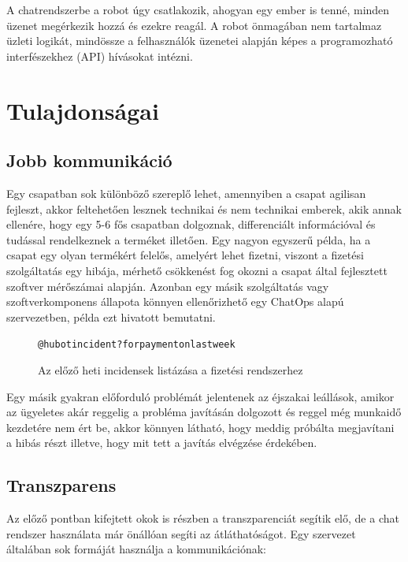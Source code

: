 A chatrendszerbe a robot úgy csatlakozik, ahogyan egy ember is tenné, minden üzenet megérkezik hozzá és ezekre reagál. A robot önmagában nem tartalmaz üzleti logikát, mindössze a felhasználók üzenetei alapján képes a programozható interfészekhez (API) hívásokat intézni.

\section{Tulajdonságai}

\subsection*{Jobb kommunikáció}
\label{subsection:better_communication}
Egy csapatban sok különböző szereplő lehet, amennyiben a csapat agilisan fejleszt, akkor feltehetően lesznek technikai és nem technikai emberek, akik annak ellenére, hogy egy 5-6 fős csapatban dolgoznak, differenciált információval és tudással rendelkeznek a terméket illetően. Egy nagyon egyszerű példa, ha a csapat egy olyan termékért felelős, amelyért lehet fizetni, viszont a fizetési szolgáltatás egy hibája, mérhető csökkenést fog okozni a csapat által fejlesztett szoftver mérőszámai alapján. Azonban egy másik szolgáltatás vagy szoftverkomponens állapota könnyen ellenőrizhető egy ChatOps alapú szervezetben,  példa ezt hivatott bemutatni.\\

\begin{figure}[H]
    \begin{alltt}
    @hubot incident? for payment on last week
    \end{alltt}
    \caption[DUMMY]%
    {Az előző heti incidensek listázása a fizetési rendszerhez}%
    \label{fig:get_outage_for_payment}
\end{figure}

Egy másik gyakran előforduló problémát jelentenek az éjszakai leállások, amikor az ügyeletes akár reggelig a probléma javításán dolgozott és reggel még munkaidő kezdetére nem ért be, akkor könnyen látható, hogy meddig próbálta megjavítani a hibás részt illetve, hogy mit tett a javítás elvégzése érdekében.

\subsection*{Transzparens}

Az előző pontban kifejtett okok is részben a transzparenciát segítik elő, de a chat rendszer használata már önállóan segíti az átláthatóságot.
Egy szervezet általában sok formáját használja a kommunikációnak:

